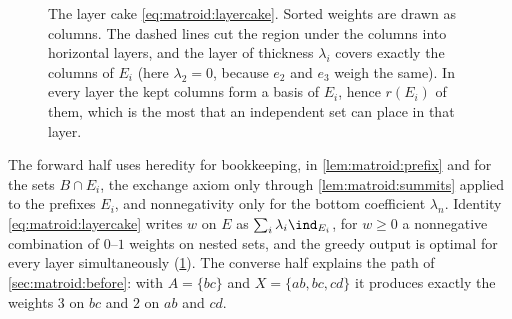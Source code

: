 \begin{refsection}
\begin{figure}[t]
\centering
{}
\caption{The layer cake \cref{eq:matroid:layercake}. Sorted weights are drawn as columns. The dashed lines cut the region under the columns into horizontal layers, and the layer of thickness $\lambda_i$ covers exactly the columns of $E_i$ (here $\lambda_2=0$, because $e_2$ and $e_3$ weigh the same). In every layer the kept columns form a basis of $E_i$, hence $r(E_i)$ of them, which is the most that an independent set can place in that layer.}
\label{fig:matroid:layercake}
\end{figure}

The forward half uses heredity for bookkeeping, in \cref{lem:matroid:prefix} and for the sets $B\cap E_i$, the exchange axiom only through \cref{lem:matroid:summits} applied to the prefixes $E_i$, and nonnegativity only for the bottom coefficient $\lambda_n$. Identity \cref{eq:matroid:layercake} writes $w$ on $E$ as $\sum_i\lambda_i\ind_{E_i}$, for $w\ge0$ a nonnegative combination of $0$--$1$ weights on nested sets, and the greedy output is optimal for every layer simultaneously (\cref{fig:matroid:layercake}). The converse half explains the path of \cref{sec:matroid:before}: with $A=\{bc\}$ and $X=\{ab,bc,cd\}$ it produces exactly the weights $3$ on $bc$ and $2$ on $ab$ and $cd$.


\end{refsection}
